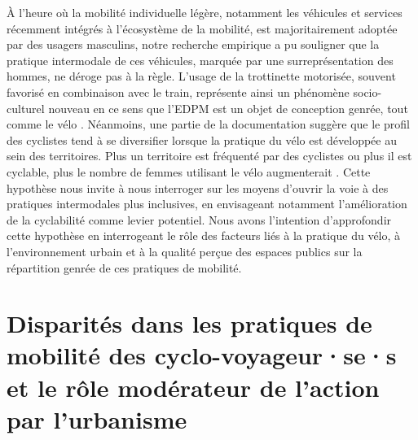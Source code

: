\begin{refsegment}
À l'heure où la mobilité individuelle légère, notamment les véhicules et services récemment intégrés à l'écosystème de la mobilité, est majoritairement adoptée par des usagers masculins, notre recherche empirique a pu souligner que la pratique intermodale de ces véhicules, marquée par une surreprésentation des hommes, ne déroge pas à la règle. L'usage de la trottinette motorisée, souvent favorisé en combinaison avec le train, représente ainsi un phénomène socio-culturel nouveau en ce sens que l'\acrshort{EDPM} est un objet de conception genrée, tout comme le vélo \textcolor{blue}{\autocites[16]{clewlow_micro-mobility_2018}[17]{sayagh_adolescentes_2018}[2]{abord_dechatillon_velo_2021}}. Néanmoins, une partie de la documentation suggère que le profil des cyclistes tend à se diversifier lorsque la pratique du vélo est développée au sein des territoires. Plus un territoire est fréquenté par des cyclistes ou plus il est cyclable, plus le nombre de femmes utilisant le vélo augmenterait \textcolor{blue}{\autocite{lardellier_cadres_2021}}. Cette hypothèse nous invite à nous interroger sur les moyens d'ouvrir la voie à des pratiques intermodales plus inclusives, en envisageant notamment l'amélioration de la cyclabilité comme levier potentiel. Nous avons l'intention d'approfondir cette hypothèse en interrogeant le rôle des facteurs liés à la pratique du vélo, à l'environnement urbain et à la qualité perçue des espaces publics sur la répartition genrée de ces pratiques de mobilité.%

    \newpage
\section{Disparités dans les pratiques de mobilité des cyclo-voyageur·se·s et le rôle modérateur de l’action par l’urbanisme
    \label{section-chap4:cyclabilite-genre}
    }


\end{refsegment}
